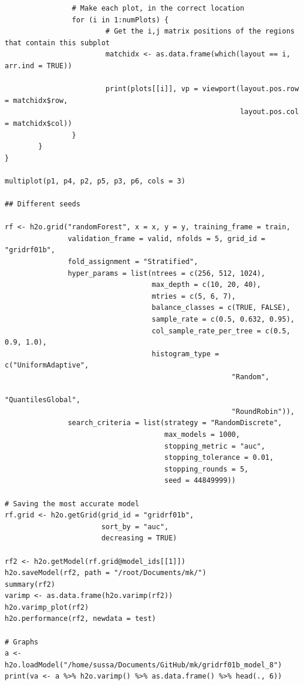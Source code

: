 \begin{verbatim}
                # Make each plot, in the correct location
                for (i in 1:numPlots) {
                        # Get the i,j matrix positions of the regions that contain this subplot
                        matchidx <- as.data.frame(which(layout == i, arr.ind = TRUE))
                        
                        print(plots[[i]], vp = viewport(layout.pos.row = matchidx$row,
                                                        layout.pos.col = matchidx$col))
                }
        }
}

multiplot(p1, p4, p2, p5, p3, p6, cols = 3)

## Different seeds

rf <- h2o.grid("randomForest", x = x, y = y, training_frame = train, 
               validation_frame = valid, nfolds = 5, grid_id = "gridrf01b",
               fold_assignment = "Stratified",
               hyper_params = list(ntrees = c(256, 512, 1024),
                                   max_depth = c(10, 20, 40),
                                   mtries = c(5, 6, 7),
                                   balance_classes = c(TRUE, FALSE),
                                   sample_rate = c(0.5, 0.632, 0.95),
                                   col_sample_rate_per_tree = c(0.5, 0.9, 1.0),
                                   histogram_type = c("UniformAdaptive",
                                                      "Random",
                                                      "QuantilesGlobal",
                                                      "RoundRobin")),
               search_criteria = list(strategy = "RandomDiscrete", 
                                      max_models = 1000, 
                                      stopping_metric = "auc", 
                                      stopping_tolerance = 0.01, 
                                      stopping_rounds = 5, 
                                      seed = 44849999)) 

# Saving the most accurate model
rf.grid <- h2o.getGrid(grid_id = "gridrf01b",
                       sort_by = "auc",
                       decreasing = TRUE)

rf2 <- h2o.getModel(rf.grid@model_ids[[1]])
h2o.saveModel(rf2, path = "/root/Documents/mk/")
summary(rf2)
varimp <- as.data.frame(h2o.varimp(rf2))
h2o.varimp_plot(rf2)
h2o.performance(rf2, newdata = test)

# Graphs
a <- h2o.loadModel("/home/sussa/Documents/GitHub/mk/gridrf01b_model_8")
print(va <- a %>% h2o.varimp() %>% as.data.frame() %>% head(., 6)) 


\end{verbatim}
